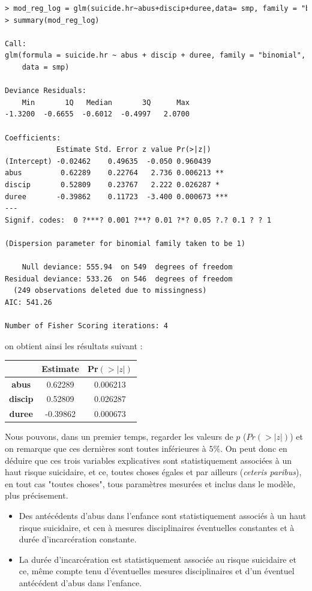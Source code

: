 \begin{lstlisting}[language=html]
> mod_reg_log = glm(suicide.hr~abus+discip+duree,data= smp, family = "binomial")
> summary(mod_reg_log)

Call:
glm(formula = suicide.hr ~ abus + discip + duree, family = "binomial", 
    data = smp)

Deviance Residuals: 
    Min       1Q   Median       3Q      Max  
-1.3200  -0.6655  -0.6012  -0.4997   2.0700  

Coefficients:
            Estimate Std. Error z value Pr(>|z|)    
(Intercept) -0.02462    0.49635  -0.050 0.960439    
abus         0.62289    0.22764   2.736 0.006213 ** 
discip       0.52809    0.23767   2.222 0.026287 *  
duree       -0.39862    0.11723  -3.400 0.000673 ***
---
Signif. codes:  0 ?***? 0.001 ?**? 0.01 ?*? 0.05 ?.? 0.1 ? ? 1

(Dispersion parameter for binomial family taken to be 1)

    Null deviance: 555.94  on 549  degrees of freedom
Residual deviance: 533.26  on 546  degrees of freedom
  (249 observations deleted due to missingness)
AIC: 541.26

Number of Fisher Scoring iterations: 4
\end{lstlisting}

on obtient ainsi les résultats suivant : 


\begin{center}
\begin{tabular}{c|c|c|}
\hline
 & \textbf{Estimate} & \textbf{Pr$(>|z|)$} \\ \hline
\multicolumn{1}{|c|}{\textbf{abus}}   & 0.62289           & 0.006213            \\ \hline
\multicolumn{1}{|c|}{\textbf{discip}} & 0.52809           & 0.026287            \\ \hline
\multicolumn{1}{|c|}{\textbf{duree}}  & -0.39862          & 0.000673            \\ \hline
\end{tabular}
\end{center}

Nous pouvons, dans un premier temps, regarder les valeurs de $p$ ($Pr(>|z|)$) et on remarque que ces dernières sont toutes inférieures à $5\%$. On peut donc en déduire que ces trois variables explicatives sont statistiquement associées à un haut risque suicidaire, et ce, toutes choses égales et par ailleurs (\textit{ceteris paribus}), en tout cas "toutes choses", tous paramètres mesurées et inclus dans le modèle, plus précisement.\newline
\begin{itemize}
\item Des antécédents d'abus dans l'enfance sont statistiquement associés à un haut risque suicidaire, et cen à mesures disciplinaires éventuelles constantes et à durée d'incarcération constante.
\item La durée d'incarcération est statistiquement associée au risque suicidaire et ce, même compte tenu d'éventuelles mesures disciplinaires et d'un éventuel antécédent d'abus dans l'enfance.
\end{itemize}

